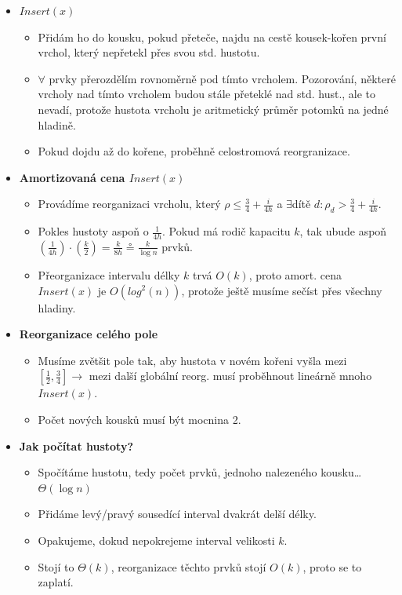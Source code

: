 \documentclass[11pt,a4paper]{article}
\begin{document}
\begin{itemize}
    \item \textbf{$Insert(x)$} 
    \begin{itemize}
        \item Přidám ho do kousku, pokud přeteče, najdu na cestě kousek-kořen první vrchol, který nepřetekl přes svou std. hustotu.
        \item $\forall$ prvky přerozdělím rovnoměrně pod tímto vrcholem. Pozorování, některé vrcholy nad tímto vrcholem budou stále přeteklé nad std. hust., ale to nevadí, protože hustota vrcholu je aritmetický průměr potomků na jedné hladině.
        \item Pokud dojdu až do kořene, proběhně celostromová reorgranizace.
    \end{itemize} 
    \item \textbf{Amortizovaná cena $Insert(x)$}
    \begin{itemize}
        \item Provádíme reorganizaci vrcholu, který $\rho \leq \frac{3}{4} + \frac{i}{4h}$ a $\exists$dítě $d: \rho_d > \frac34 + \frac{i}{4h}$.
        \item Pokles hustoty aspoň o $\frac1{4h}$. Pokud má rodič kapacitu $k$, tak ubude aspoň $(\frac1{4h})\cdot(\frac{k}2) = \frac{k}{8h} \circeq  \frac{k}{\log n}$ prvků. 
        \item Přeorganizace intervalu délky $k$ trvá $O(k)$, proto amort. cena $Insert(x)$ je $O(log^2(n))$, protože ještě musíme sečíst přes všechny hladiny.
    \end{itemize}
    \item \textbf{Reorganizace celého pole}
    \begin{itemize}
        \item Musíme zvětšit pole tak, aby hustota v novém kořeni vyšla mezi $[\frac12, \frac34] \rightarrow$ mezi další globální reorg. musí proběhnout lineárně mnoho $Insert(x)$.
        \item Počet nových kousků musí být mocnina 2. 
    \end{itemize}
    \item \textbf{Jak počítat hustoty?}
    \begin{itemize}
        \item Spočítáme hustotu, tedy počet prvků, jednoho nalezeného kousku\dots $\Theta(\log n)$
        \item Přidáme levý/pravý sousedící interval dvakrát delší délky.
        \item Opakujeme, dokud nepokrejeme interval velikosti $k$.
        \item Stojí to $\Theta(k)$, reorganizace těchto prvků stojí $O(k)$, proto se to zaplatí.

\end{itemize}
\end{itemize}
\end{document}
